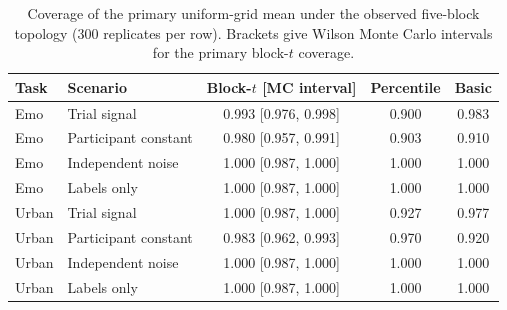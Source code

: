 \begin{table}[ht]\centering\small
\caption{Coverage of the primary uniform-grid mean under the observed five-block topology (300 replicates per row). Brackets give Wilson Monte Carlo intervals for the primary block-$t$ coverage.}
\begin{tabular}{llccc}\toprule
Task & Scenario & Block-$t$ [MC interval] & Percentile & Basic\\\midrule
Emo & Trial signal & 0.993 [0.976, 0.998] & 0.900 & 0.983\\
Emo & Participant constant & 0.980 [0.957, 0.991] & 0.903 & 0.910\\
Emo & Independent noise & 1.000 [0.987, 1.000] & 1.000 & 1.000\\
Emo & Labels only & 1.000 [0.987, 1.000] & 1.000 & 1.000\\
Urban & Trial signal & 1.000 [0.987, 1.000] & 0.927 & 0.977\\
Urban & Participant constant & 0.983 [0.962, 0.993] & 0.970 & 0.920\\
Urban & Independent noise & 1.000 [0.987, 1.000] & 1.000 & 1.000\\
Urban & Labels only & 1.000 [0.987, 1.000] & 1.000 & 1.000\\
\bottomrule\end{tabular}
\end{table}
